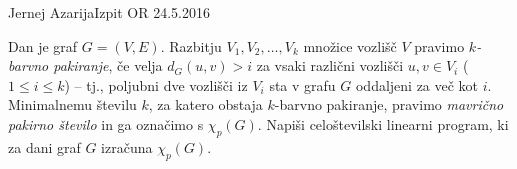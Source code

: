 \begin{naloga}{Jernej Azarija}{Izpit OR 24.5.2016}
\begin{vprasanje}
Dan je graf $G = (V, E)$.
Razbitju $V_1, V_2, \dots, V_k$ množice vozlišč $V$
pravimo {\em $k$-barvno pakiranje},
če velja $d_G(u, v) > i$ za vsaki različni vozlišči $u, v \in V_i$
($1 \le i \le k$) --
tj., poljubni dve vozlišči iz $V_i$ sta v grafu $G$ oddaljeni za več kot $i$.
Minimalnemu številu $k$, za katero obstaja $k$-barvno pakiranje,
pravimo {\em mavrično pakirno število} in ga označimo s $\chi_p(G)$.
Napiši celoštevilski linearni program,
ki za dani graf $G$ izračuna $\chi_p(G)$.
\end{vprasanje}
\begin{odgovor}
\end{odgovor}
\end{naloga}
